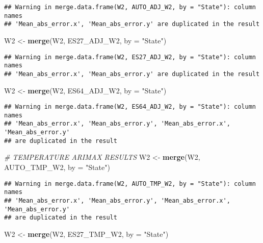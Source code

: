 \documentclass[
]{article}
\newenvironment{Shaded}{\begin{snugshade}}{\end{snugshade}}
\newcommand{\AttributeTok}[1]{\textcolor[rgb]{0.13,0.29,0.53}{#1}}
\newcommand{\CommentTok}[1]{\textcolor[rgb]{0.56,0.35,0.01}{\textit{#1}}}
\newcommand{\FunctionTok}[1]{\textcolor[rgb]{0.13,0.29,0.53}{\textbf{#1}}}
\newcommand{\NormalTok}[1]{#1}
\newcommand{\OtherTok}[1]{\textcolor[rgb]{0.56,0.35,0.01}{#1}}
\newcommand{\StringTok}[1]{\textcolor[rgb]{0.31,0.60,0.02}{#1}}
\begin{document}
\begin{verbatim}
## Warning in merge.data.frame(W2, AUTO_ADJ_W2, by = "State"): column names
## 'Mean_abs_error.x', 'Mean_abs_error.y' are duplicated in the result
\end{verbatim}

\begin{Shaded}
\begin{Highlighting}[]
\NormalTok{W2 }\OtherTok{\textless{}{-}} \FunctionTok{merge}\NormalTok{(W2, ES27\_ADJ\_W2, }\AttributeTok{by =} \StringTok{"State"}\NormalTok{)}
\end{Highlighting}
\end{Shaded}

\begin{verbatim}
## Warning in merge.data.frame(W2, ES27_ADJ_W2, by = "State"): column names
## 'Mean_abs_error.x', 'Mean_abs_error.y' are duplicated in the result
\end{verbatim}

\begin{Shaded}
\begin{Highlighting}[]
\NormalTok{W2 }\OtherTok{\textless{}{-}} \FunctionTok{merge}\NormalTok{(W2, ES64\_ADJ\_W2, }\AttributeTok{by =} \StringTok{"State"}\NormalTok{)}
\end{Highlighting}
\end{Shaded}

\begin{verbatim}
## Warning in merge.data.frame(W2, ES64_ADJ_W2, by = "State"): column names
## 'Mean_abs_error.x', 'Mean_abs_error.y', 'Mean_abs_error.x', 'Mean_abs_error.y'
## are duplicated in the result
\end{verbatim}

\begin{Shaded}
\begin{Highlighting}[]
\CommentTok{\# TEMPERATURE ARIMAX RESULTS}
\NormalTok{W2 }\OtherTok{\textless{}{-}} \FunctionTok{merge}\NormalTok{(W2, AUTO\_TMP\_W2, }\AttributeTok{by =} \StringTok{"State"}\NormalTok{)}
\end{Highlighting}
\end{Shaded}

\begin{verbatim}
## Warning in merge.data.frame(W2, AUTO_TMP_W2, by = "State"): column names
## 'Mean_abs_error.x', 'Mean_abs_error.y', 'Mean_abs_error.x', 'Mean_abs_error.y'
## are duplicated in the result
\end{verbatim}

\begin{Shaded}
\begin{Highlighting}[]
\NormalTok{W2 }\OtherTok{\textless{}{-}} \FunctionTok{merge}\NormalTok{(W2, ES27\_TMP\_W2, }\AttributeTok{by =} \StringTok{"State"}\NormalTok{)}
\end{Highlighting}
\end{Shaded}
\end{document}
